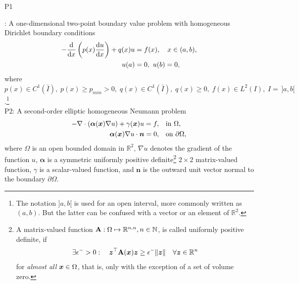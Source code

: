 	\hypertarget{P1}{P1}:
	 A one-dimensional two-point boundary value problem
	 with homogeneous Dirichlet boundary conditions
	\begin{align}
	  -\frac{\mathrm{d}}{\mathrm{d} x}\left(p(x)\frac{\mathrm{d} u}{\mathrm{d} x}\right)+q(x)u&=f(x),
	   \quad x\in (a,b), \label{eq:ODE model}\\
	 u(a) &= 0,\ u(b) = 0, \label{eq:ODE Dir BCs}
	\end{align}
	where $p(x) \in C^1(\bar{I}),\; p(x)\geq p_{min}>0,\; 
	q(x) \in  C^1(\bar{I}),\; q(x)\geq 0,\; f(x) \in L^2(I),\;
	I =\,]a,b[ $.\footnote{The notation $]a,b[$ is used for an open 
	interval, more commonly written as $(a,b)$. But the latter can be
	confused with a vector or an element of $\mathbb{R}^2$. } \\	
	
	
	\hypertarget{P2}{P2}:
	 A second-order elliptic homogeneous Neumann problem
	\begin{align}
	-\nabla\cdot(\bm{\alpha}(\bx) \nabla u)+
	\gamma(\bx)u=f,\quad &\textrm{in} \ \Omega,
	\label{eq:PDE model} \\ 
	\bm{\alpha}(\bx)\nabla{u}\cdot\bm{n}=0,\quad &\textrm{on}\ \partial\Omega,
	\label{eq:PDE Neu BC}
	\end{align}
	where $\Omega$ is an open bounded domain in $\mathbb{R}^2$,
	$\nabla{u}$ denotes the gradient of the function $u$, 
	$\bm{\alpha}$ is a symmetric uniformly positive definite\footnote{
		A matrix-valued function $\mathbf{A}:\Omega\mapsto\mathbb{R}^{n,n},n\in
	\mathbb{N}$, is called uniformly positive definite, if
	\[\exists\epsilon^{-}>0:\quad\bm{z}^\top\mathbf{A}(\bm{x})\bm{z}\geq 
	\epsilon^{-}\lVert\bm{z}\rVert\quad\forall\bm{z}\in\mathbb{R}^{n}\]
	for \emph{almost all} $\bm{x}\in\Omega$, that is, only with the exception of
	a set of volume zero.
	}
	$2\times 2$	matrix-valued function, $\gamma$ is a scalar-valued 
	function, and $\bm{n}$ is the outward unit vector normal to the 
	boundary $\partial \Omega$.\\
	
